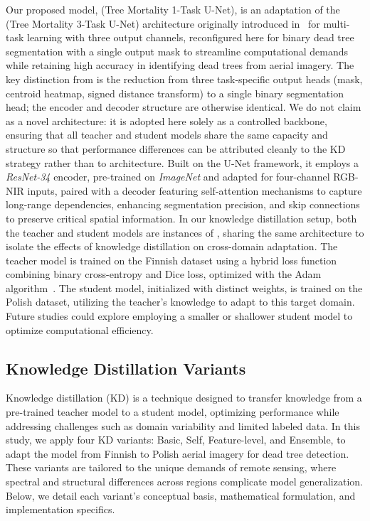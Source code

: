 \documentclass[twocolumn]{article}
\begin{document}
Our proposed model, \oursone (Tree Mortality 1-Task U-Net), is an adaptation of the \oursthree  (Tree Mortality 3-Task U-Net) architecture originally introduced in~\citep{rahman2025dual} for multi-task learning with three output channels, reconfigured here for binary dead tree segmentation with a single output mask to streamline computational demands while retaining high accuracy in identifying dead trees from aerial imagery. The key distinction from \oursthree is the reduction from three task-specific output heads (mask, centroid heatmap, signed distance transform) to a single binary segmentation head; the encoder and decoder structure are otherwise identical. We do not claim \oursone as a novel architecture: it is adopted here solely as a controlled backbone, ensuring that all teacher and student models share the same capacity and structure so that performance differences can be attributed cleanly to the KD strategy rather than to architecture. Built on the U-Net framework, it employs a \textit{ResNet-34} encoder, pre-trained on \textit{ImageNet} and adapted for four-channel RGB-NIR inputs, paired with a decoder featuring self-attention mechanisms to capture long-range dependencies, enhancing segmentation precision, and skip connections to preserve critical spatial information. In our knowledge distillation setup, both the teacher and student models are instances of \oursone, sharing the same architecture to isolate the effects of knowledge distillation on cross-domain adaptation. The teacher model is trained on the Finnish dataset using a hybrid loss function combining binary cross-entropy and Dice loss, optimized with the Adam algorithm~\citep{kingma2014adam}. The student model, initialized with distinct weights, is trained on the Polish dataset, utilizing the teacher's knowledge to adapt to this target domain. Future studies could explore employing a smaller or shallower student model to optimize computational efficiency.

\subsection{Knowledge Distillation Variants}

Knowledge distillation (KD) is a technique designed to transfer knowledge from a pre-trained teacher model to a student model, optimizing performance while addressing challenges such as domain variability and limited labeled data. In this study, we apply four KD variants: Basic, Self, Feature-level, and Ensemble, to adapt the \oursone model from Finnish to Polish aerial imagery for dead tree detection. These variants are tailored to the unique demands of remote sensing, where spectral and structural differences across regions complicate model generalization. Below, we detail each variant's conceptual basis, mathematical formulation, and implementation specifics.
\end{document}

